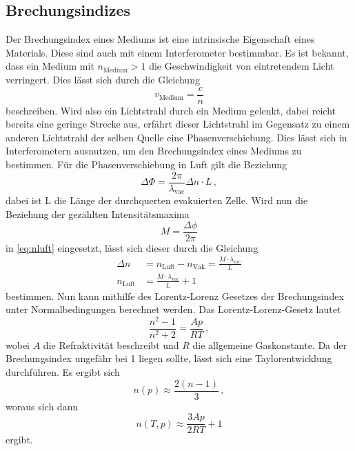 \subsection{Brechungsindizes} \label{sec:n}

Der Brechungsindex eines Mediums ist eine intrinsische Eigenschaft eines Materials.
Diese sind auch mit einem Interferometer bestimmbar.
Es ist bekannt, dass ein Medium mit $n_\text{Medium} > 1$ die Geschwindigkeit von eintretendem Licht verringert.
Dies lässt sich durch die Gleichung
\begin{equation*}
    v_\text{Medium} = \frac{c}{n}
\end{equation*}
beschreiben. Wird also ein Lichtstrahl durch ein Medium gelenkt, 
dabei reicht bereits eine geringe Strecke aus, 
erfährt dieser Lichtstrahl im Gegensatz zu einem anderen Lichtstrahl der selben Quelle eine Phasenverschiebung.
Dies lässt sich in Interferometern ausnutzen, um den Brechungsindex eines Mediums zu bestimmen.
Für die Phasenverschiebung in Luft gilt die Beziehung \cite{v64}
\begin{equation} \label{eq:nluft}
    \Delta \Phi = \frac{2 \pi}{\lambda_\text{vac}} \Delta n \cdot L \, ,
\end{equation}
dabei ist L die Länge der durchquerten evakuierten Zelle.
Wird nun die Beziehung der gezählten Intensitätsmaxima 
\begin{equation} \label{eq:maxima}
    M = \frac{\Delta \phi}{2 \pi}
  \end{equation}
in \autoref{eq:nluft} eingesetzt, lässt sich dieser durch die Gleichung
\begin{align} \label{eq:nluft2}
    \Delta n &= n_\text{Luft} - n_\text{Vak} = \frac{M \cdot \lambda_\text{vac}}{L} \nonumber \\
    n_\text{Luft} &= \frac{M \cdot \lambda_\text{vac}}{L} + 1
\end{align}
bestimmen.
Nun kann mithilfe des Lorentz-Lorenz Gesetzes der Brechungsindex unter Normalbedingungen berechnet werden.
Das Lorentz-Lorenz-Gesetz lautet
\begin{equation*}
    \frac{n^2 - 1}{n^2 + 2} = \frac{A p}{R T} \, ,
\end{equation*}
wobei $A$ die Refraktivität beschreibt und $R$ die allgemeine Gaskonstante.
Da der Brechungsindex ungefähr bei 1 liegen sollte, lässt sich eine Taylorentwicklung durchführen. Es ergibt sich
\begin{equation*}
    n(p) \approx \frac{2 (n-1)}{3} \, ,
\end{equation*} 
woraus sich dann
\begin{equation} \label{eq:lorentz}
    n (T,p) \approx \frac{3 A p}{ 2 R T} + 1
\end{equation}
ergibt.

